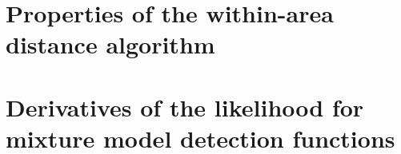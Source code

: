 \documentclass[12pt]{report}
\begin{document}
\appendix

\chapter{Properties of the within-area distance algorithm}




\chapter{Derivatives of the likelihood for mixture model detection functions}















\end{document}

